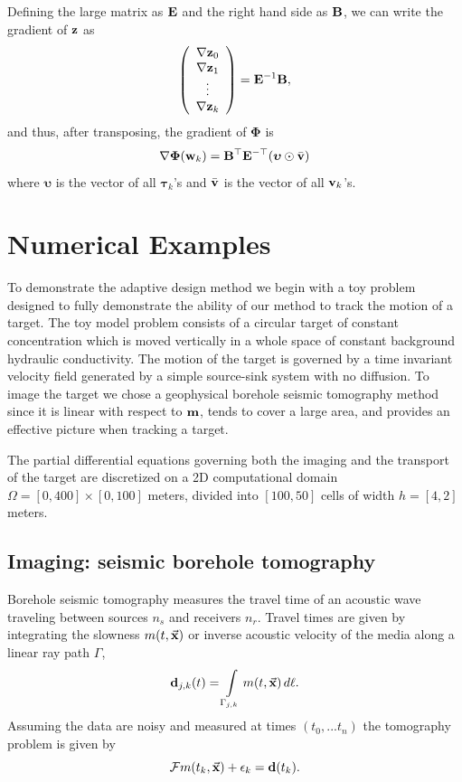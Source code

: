\documentclass[11pt]{article}
\newcommand{\bfB}	{{\bf{B}}}
\newcommand{\bfE}	{{\bf{E}}}
\newcommand{\bfd}	{{\bf{d}}}
\newcommand{\bfm}	{{\bf{m}}}
\newcommand{\bfv}	{{\bf{v}}}
\newcommand{\bfw}	{{\bf{w}}}
\newcommand{\bfz}	{{\bf{z}}}
\newcommand{\bfPhi}     {{\boldsymbol \Phi}}
\newcommand{\bftau}      {{\boldsymbol \tau}}
\newcommand{\bfupsilon}      {{\boldsymbol \upsilon}}
\newcommand {\vx}    {\vec {\bf x}}
\newcommand{\grad}	{\ensuremath {{\bf{ \nabla}}}}
\newcommand{\CF} 	 {\mathcal{F}}    %
\begin{document}
Defining the large matrix as $\bfE$ and the right hand side as $\bfB$, we can write the gradient of $\bfz$ as 
\begin{equation}
\left(\begin{array}{c} \grad\bfz_0 \\ \grad\bfz_1\\ \vdots\\ \grad\bfz_k \end{array}\right) = \bfE^{-1}\bfB,
\end{equation}
and thus, after transposing, the gradient of $\bfPhi$ is
\begin{equation}
\nabla \bfPhi(\bfw_k) = \bfB^{\top}\bfE^{- \top}(\bfupsilon \odot \bar{\bfv})
\end{equation}
where $\bfupsilon$ is the vector of all $\bftau_k$'s and $\bar{\bfv}$ is the vector of all $\bfv_k$'s.

 





\section{Numerical Examples }
\label{sec: Example1}
To demonstrate the adaptive  design method we begin with a toy problem designed to fully demonstrate the ability of our method to track the motion of a target. The toy model problem consists of a  circular target of constant concentration which is moved vertically in a whole space of constant background hydraulic conductivity. The motion of the target is governed by  a time invariant velocity field generated by a simple source-sink  system with no diffusion. 
To image the target we chose a geophysical  borehole seismic tomography method since it is linear with respect to $\bfm$, tends to cover a large area, and provides an effective picture when tracking a target. 

The partial differential equations governing both the imaging and the transport of the target are discretized on a  2D computational domain  $\Omega=[0, 400] \times [0, 100]$ meters,  divided into $[100, 50]$ cells of width $h = [4,2]$ meters.


\subsection{Imaging: seismic borehole tomography}
 Borehole seismic tomography  measures the travel time of an acoustic wave traveling between sources $n_s$ and receivers $n_r$. Travel times are given by integrating the slowness  $m(t,\vx)$  or inverse acoustic velocity of the media  along a linear ray path $\Gamma$,
\begin{equation*}\label{eq:tomo}
\bfd_{j,k}(t) =  \int\limits_{\Gamma_{j,k}} m(t,\vx)\, d\ell.
\end{equation*}
 Assuming the data are noisy and measured at times $(t_0,...t_n)$ the tomography problem is given by 
 \begin{equation*}
 \CF m(t_{k},\vx) + \epsilon_{k}  = \bfd(t_{k}).\\
\end{equation*}
\end{document}
